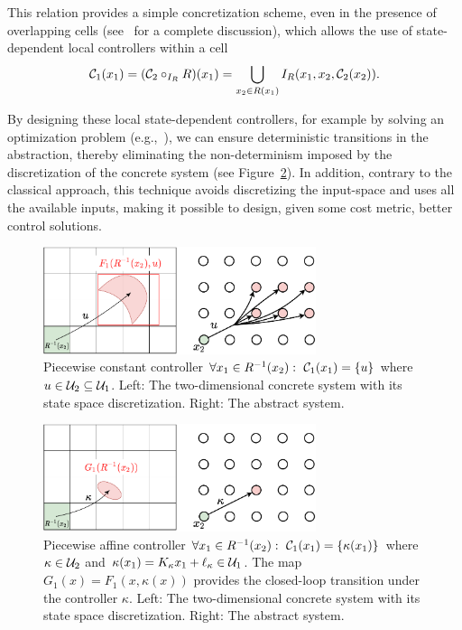 \documentclass{juliacon}
\begin{document}
This relation provides a simple concretization scheme, even in the presence of overlapping cells (see~\cite{Calbert2024a} for a complete discussion), which allows the use of state-dependent local controllers within a cell 
$$\mathcal{C}_1(x_1) = (\mathcal{C}_2\circ_{I_R} R)(x_1) =\bigcup_{x_2\in R(x_1)} I_R(x_1,x_2,\mathcal{C}_2(x_2)).$$


By designing these local state-dependent controllers, for example by solving an optimization problem (e.g.,~\cite[Section V]{calbert2024smart}), we can ensure deterministic transitions in the abstraction, thereby eliminating the non-determinism imposed by the discretization of the concrete system (see Figure~\ref{fig:Piece-wise-dependent}). 
In addition, contrary to the classical approach, this technique avoids discretizing the input-space and uses all the available inputs, making it possible to design, given some cost metric, better control solutions.

\begin{figure}[t]
\centerline{\includegraphics[width=8cm]{Figures/Abstraction/Piece-wise-constant.pdf}}
\caption{Piecewise constant controller $\forall x_1\in R^{-1}(x_2):\ \mathcal{C}_1(x_1) = \{u\}$ where $u\in \mathcal{U}_2\subseteq \mathcal{U}_1$. 
Left: The two-dimensional concrete system with its state space discretization. Right: The abstract system.}
	\label{fig:Piece-wise-constant}
\end{figure}

\begin{figure}[t]
\centerline{\includegraphics[width=8cm]{Figures/Abstraction/Piece-wise-dependent.pdf}}
\caption{Piecewise affine controller $\forall x_1\in R^{-1}(x_2):\ \mathcal{C}_1(x_1) = \{\kappa(x_1)\}$ where $\kappa\in\mathcal{U}_2$ and $\kappa(x_1) = K_{\kappa}x_1 + \ell_{\kappa}\in  \mathcal{U}_1$.  The map $G_1(x) = F_1(x,\kappa(x))$ provides the closed-loop transition under the controller $\kappa$.
Left: The two-dimensional concrete system with its state space discretization. Right: The abstract system.}
	\label{fig:Piece-wise-dependent}
\end{figure}
\end{document}
